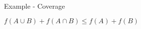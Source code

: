 \begin{frame}{Example - Coverage}
\begin{center}
$f(A \cup B) + f(A \cap B) \leq f(A) + f(B)$
\end{center}
\begin{center}

\end{center}
\end{frame}
